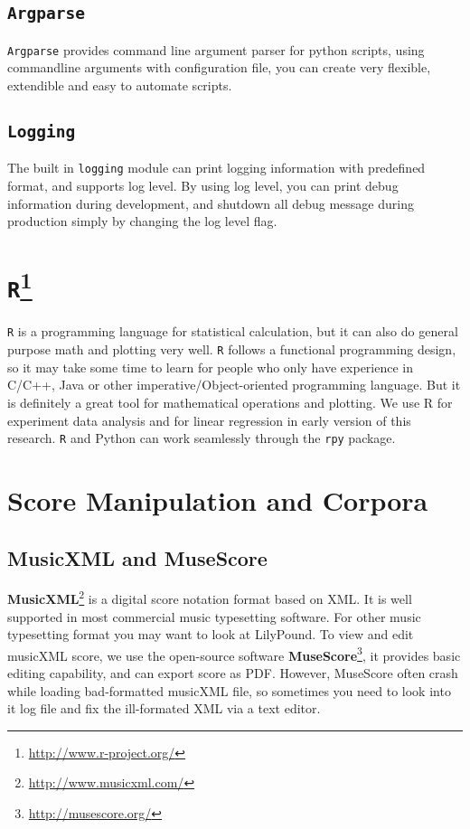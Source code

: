    \subsection*{\texttt{Argparse}}
   \texttt{Argparse} provides command line argument parser for python scripts, using commandline arguments with configuration file, you can create very flexible, extendible and easy to automate scripts.

   \subsection*{\texttt{Logging}}
   The built in \texttt{logging} module can print logging information with predefined format, and supports log level. By using log level, you can print debug information during development, and shutdown all debug message during production simply by changing the log level flag.

   \section*{\texttt{R}\footnote{\url{http://www.r-project.org/}}}
   \texttt{R} is a programming language for statistical calculation, but it can also do general purpose math and plotting very well. \texttt{R} follows a functional programming design, so it may take some time to learn for people who only have experience in C/C++, Java or other imperative/Object-oriented programming language. But it is definitely a great tool for mathematical operations and plotting. We use R for experiment data analysis and for linear regression in early version of this research. \texttt{R} and Python can work seamlessly through the \texttt{rpy} package.

\section*{Score Manipulation and Corpora}
\subsection*{MusicXML and MuseScore}
\textbf{MusicXML}\footnote{\url{http://www.musicxml.com/}} is a digital score notation format based on XML. It is well supported in most commercial music typesetting software. For other music typesetting format you may want to look at LilyPound. To view and edit musicXML score, we use the open-source software \textbf{MuseScore}\footnote{\url{http://musescore.org/}}, it provides basic editing capability, and can export score as PDF. However, MuseScore often crash while loading bad-formatted musicXML file, so sometimes you need to look into it log file and fix the ill-formated XML via a text editor.
